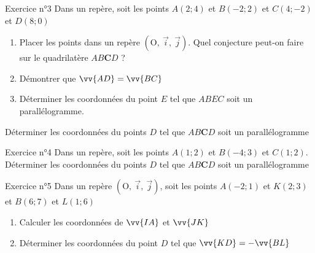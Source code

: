 \documentclass[12pt,a4paper]{article}
\def\Oij{$\left(\text{O},~\vec{i},~\vec{j}\right)$}
\begin{document}
\begin{mybox}{Exercice n°3}
Dans un repère, soit les points $A(2; 4)$ et $B(-2; 2)$ et $C(4; -2)$ et $D(8;0)$\\

\begin{enumerate}
    \item Placer les points dans un repère \Oij{}. Quel conjecture peut-on faire sur le quadrilatère $AB\textbf{C}D$ ?
    \item Démontrer que $\vv{AD}=\vv{BC}$
    \item Déterminer les coordonnées du point $E$ tel que $ABEC$ soit un parallélogramme.
\end{enumerate}

Déterminer les coordonnées du points $D$ tel que $AB\textbf{C}D$ soit un parallélogramme
\end{mybox}

\begin{framed}
\vspace{3cm}
\end{framed}





\begin{mybox}{Exercice n°4}
Dans un repère, soit les points $A(1; 2)$ et $B(-4; 3)$ et $C(1; 2)$.\\
Déterminer les coordonnées du points $D$ tel que $AB\textbf{C}D$ soit un parallélogramme
\end{mybox}

\begin{framed}
\vspace{3cm}
\end{framed}


\begin{mybox}{Exercice n°5}
Dans un repère \Oij{}, soit les points $A(-2; 1)$ et $K(2; 3)$ et $B(6; 7)$ et $L(1;6)$\\
\begin{enumerate}
    \item Calculer les coordonnées de $\vv{IA}$ et $\vv{JK}$
    \item Déterminer les coordonnées du point $D$ tel que $\vv{KD}=-\vv{BL}$
\end{enumerate}
\end{mybox}

\begin{framed}
\vspace{3cm}
\end{framed}
\end{document}
